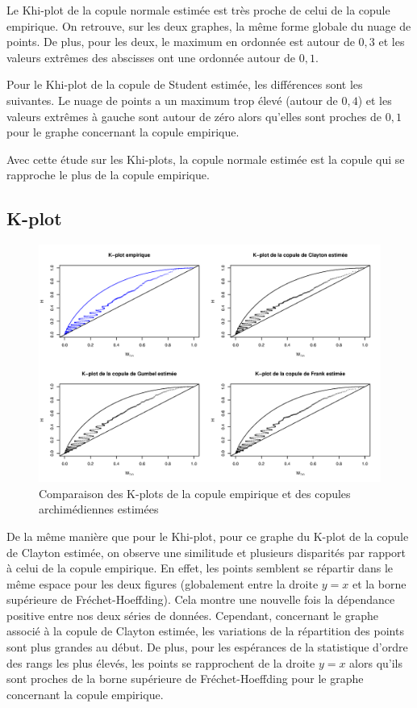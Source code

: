 Le Khi-plot de la copule normale estimée est très proche de celui de la copule empirique. On retrouve, sur les deux graphes, la même forme globale du nuage de points. De plus, pour les deux, le maximum en ordonnée est autour de $0,3$ et les valeurs extrêmes des abscisses ont une ordonnée autour de $0,1$. 

Pour le Khi-plot de la copule de Student estimée, les différences sont les suivantes. Le nuage de points a un maximum trop élevé (autour de $0,4$) et les valeurs extrêmes à gauche sont autour de zéro alors qu'elles sont proches de $0,1$ pour le graphe concernant la copule empirique.

Avec cette étude sur les Khi-plots, la copule normale estimée est la copule qui se rapproche le plus de la copule empirique.

\subsection{K-plot}

\noindent%
\begin{figure}[H]
    \begin{center}
      \includegraphics[width=17 cm, angle=0]{./pictures/archcmlkplot.png}
      \centering\caption{\label{2}Comparaison des K-plots de la copule empirique et des copules archimédiennes estimées}
    \end{center}
\end{figure}

De la même manière que pour le Khi-plot, pour ce graphe du K-plot de la copule de Clayton estimée, on observe une similitude et plusieurs disparités par rapport à celui de la copule empirique. En effet, les points semblent se répartir dans le même espace pour les deux figures (globalement entre la droite $y=x$ et la borne supérieure de Fréchet-Hoeffding). Cela montre une nouvelle fois la dépendance positive entre nos deux séries de données. Cependant, concernant le graphe associé à la copule de Clayton estimée, les variations de la répartition des points sont plus grandes au début. De plus, pour les espérances de la statistique d'ordre des rangs les plus élevés, les points se rapprochent de la droite $y=x$ alors qu'ils sont proches de la borne supérieure de Fréchet-Hoeffding pour le graphe concernant la copule empirique.

